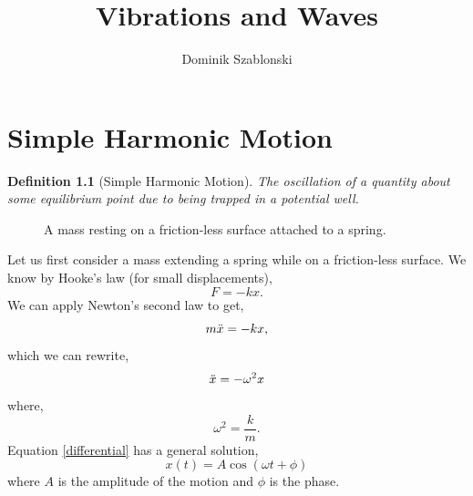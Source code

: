 \documentclass{book}
\title{Vibrations and Waves}
\author{Dominik Szablonski}
\newtheorem*{definition}{Definition}
\begin{document}
\maketitle

\tableofcontents

\chapter{Simple Harmonic Motion}
\begin{definition}[Simple Harmonic Motion]
    The oscillation of a quantity about some equilibrium point due to being trapped in a potential well.
\end{definition}
\begin{figure}[h]
\begin{center}
\end{center}
\caption{A mass resting on a friction-less surface attached to a spring.}
    \label{fig:enter-label}
\end{figure}

\noindent
Let us first consider a mass extending a spring while on a friction-less surface. We know by Hooke's law (for small displacements),
\begin{equation*}
    F = -kx.
\end{equation*}
We can apply Newton's second law to get,
\begin{equation}
    m\Ddot{x} = -k x,
\end{equation}
which we can rewrite,
\begin{equation}\label{differential}
    \Ddot{x} = -\omega^2x
\end{equation}
where,
\begin{equation}
    \omega^2 = \frac{k}{m}.
\end{equation}
Equation \eqref{differential} has a general solution,
\begin{equation}\label{springsolution}
    x(t) = A\cos(\omega t + \phi)
\end{equation}
where $A$ is the amplitude of the motion and $\phi$ is the phase.
\end{document}

